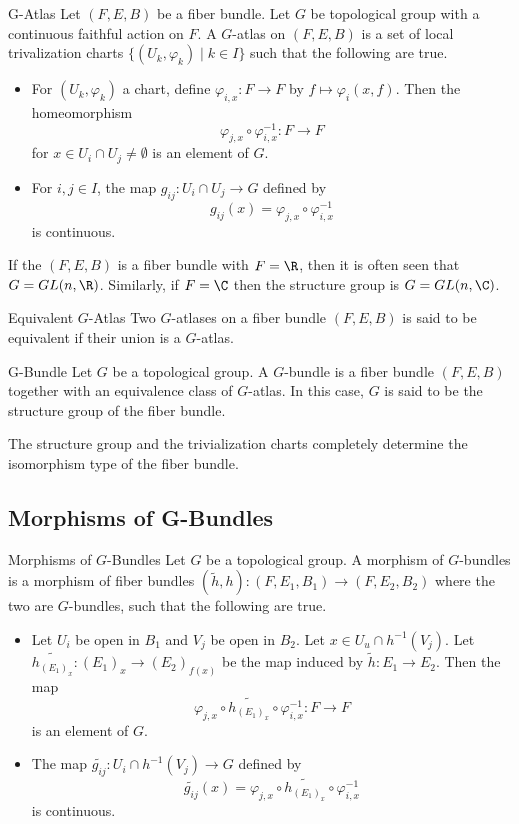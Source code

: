 \documentclass[a4paper]{article}
\begin{document}
\begin{defn}{G-Atlas}{} Let $(F,E,B)$ be a fiber bundle. Let $G$ be topological group with a continuous faithful action on $F$. A $G$-atlas on $(F,E,B)$ is a set of local trivalization charts $\{(U_k,\varphi_k)\;|\;k\in I\}$ such that the following are true. 
\begin{itemize}
\item For $(U_k,\varphi_k)$ a chart, define $\varphi_{i,x}:F\to F$ by $f\mapsto\varphi_i(x,f)$. Then the homeomorphism $$\varphi_{j,x}\circ\varphi_{i,x}^{-1}:F\to F$$ for $x\in U_i\cap U_j\neq\emptyset$ is an element of $G$. 
\item For $i,j\in I$, the map $g_{ij}:U_i\cap U_j\to G$ defined by $$g_{ij}(x)=\varphi_{j,x}\circ\varphi_{i,x}^{-1}$$ is continuous. 
\end{itemize}
\end{defn}

If the $(F,E,B)$ is a fiber bundle with $F=\R$, then it is often seen that $G=GL(n,\R)$. Similarly, if $F=\C$ then the structure group is $G=GL(n,\C)$. 

\begin{defn}{Equivalent $G$-Atlas}{} Two $G$-atlases on a fiber bundle $(F,E,B)$ is said to be equivalent if their union is a $G$-atlas. 
\end{defn}

\begin{defn}{G-Bundle}{} Let $G$ be a topological group. A $G$-bundle is a fiber bundle $(F,E,B)$ together with an equivalence class of $G$-atlas. In this case, $G$ is said to be the structure group of the fiber bundle. 
\end{defn}

The structure group and the trivialization charts completely determine the isomorphism type of the fiber bundle. 

\subsection{Morphisms of G-Bundles}
\begin{defn}{Morphisms of $G$-Bundles}{} Let $G$ be a topological group. A morphism of $G$-bundles is a morphism of fiber bundles $(\tilde{h},h):(F,E_1,B_1)\to(F,E_2,B_2)$ where the two are $G$-bundles, such that the following are true. 
\begin{itemize}
\item Let $U_i$ be open in $B_1$ and $V_j$ be open in $B_2$. Let $x\in U_u\cap h^{-1}(V_j)$. Let $\widetilde{h_{(E_1)_x}}:(E_1)_x\to(E_2)_{f(x)}$ be the map induced by $\tilde{h}:E_1\to E_2$. Then the map $$\varphi_{j,x}\circ\widetilde{h_{(E_1)_x}}\circ\varphi_{i,x}^{-1}:F\to F$$ is an element of $G$. 
\item The map $\widetilde{g_{ij}}:U_i\cap h^{-1}(V_j)\to G$ defined by $$\widetilde{g_{ij}}(x)=\varphi_{j,x}\circ\widetilde{h_{(E_1)_x}}\circ\varphi_{i,x}^{-1}$$ is continuous. 
\end{itemize}
\end{defn}
\end{document}
